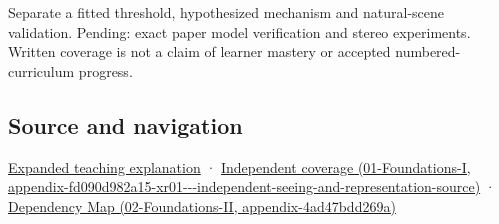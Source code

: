 Separate a fitted threshold, hypothesized mechanism and natural-scene validation. Pending: exact paper model verification and stereo experiments. Written coverage is not a claim of learner mastery or accepted numbered-curriculum progress.

\subsection{Source and navigation}\label{appendix-8dc848f14052-source-and-navigation}

\hyperref[04-visual-computing-ii-ch042-binocular-depth-changes-the-optimization-question]{Expanded teaching explanation} · \href{../01-Foundations-I/main.pdf\#nameddest=appendix-fd090d982a15-xr01---independent-seeing-and-representation-source}{Independent coverage (01-Foundations-I, appendix-fd090d982a15-xr01-\/-\/-independent-seeing-and-representation-source)} · \href{../02-Foundations-II/main.pdf\#nameddest=appendix-4ad47bdd269a}{Dependency Map (02-Foundations-II, appendix-4ad47bdd269a)}

